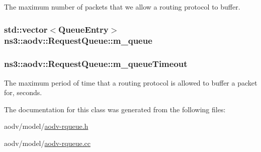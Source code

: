 The maximum number of packets that we allow a routing protocol to buffer. 

\subsubsection[{\texorpdfstring{m\+\_\+queue}{m_queue}}]{\setlength{\rightskip}{0pt plus 5cm}std\+::vector$<${\bf Queue\+Entry}$>$ ns3\+::aodv\+::\+Request\+Queue\+::m\+\_\+queue\hspace{0.3cm}{\ttfamily [private]}}\hypertarget{classns3_1_1aodv_1_1RequestQueue_a82316614d880a232fd2ad5fc2067088a}{}\label{classns3_1_1aodv_1_1RequestQueue_a82316614d880a232fd2ad5fc2067088a}
\subsubsection[{\texorpdfstring{m\+\_\+queue\+Timeout}{m_queueTimeout}}]{ ns3\+::aodv\+::\+Request\+Queue\+::m\+\_\+queue\+Timeout\hspace{0.3cm}{\ttfamily [private]}}\hypertarget{classns3_1_1aodv_1_1RequestQueue_aa6026890dfa99e5104d035cf9aedbc28}{}\label{classns3_1_1aodv_1_1RequestQueue_aa6026890dfa99e5104d035cf9aedbc28}


The maximum period of time that a routing protocol is allowed to buffer a packet for, seconds. 



The documentation for this class was generated from the following files\+:\begin{DoxyCompactItemize}
\item 
aodv/model/\hyperlink{aodv-rqueue_8h}{aodv-\/rqueue.\+h}\item 
aodv/model/\hyperlink{aodv-rqueue_8cc}{aodv-\/rqueue.\+cc}\end{DoxyCompactItemize}
